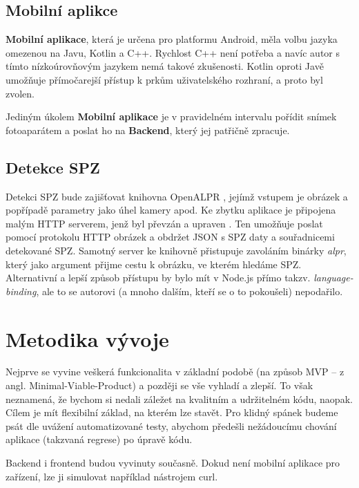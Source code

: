 \subsection{Mobilní aplikce} \label{mobile_app}

\textbf{Mobilní aplikace}, která je určena pro platformu Android, měla volbu jazyka omezenou na Javu, Kotlin a C++.
Rychlost C++ není potřeba a navíc autor s tímto nízkoúrovňovým jazykem nemá takové zkušenosti.
Kotlin oproti Javě umožňuje přímočarejší přístup k prkům uživatelského rozhraní, a proto byl zvolen.

Jediným úkolem \textbf{Mobilní aplikace} je v pravidelném intervalu pořídit snímek fotoaparátem a poslat ho na
\textbf{Backend}, který jej patřičně zpracuje.

\subsection{Detekce SPZ}

Detekci SPZ bude zajišťovat knihovna OpenALPR \citep[viz][]{OpenALPR}, jejímž vstupem je obrázek a popřípadě
parametry jako úhel kamery apod. Ke zbytku aplikace je připojena malým HTTP serverem, jenž byl převzán a upraven
\citep[viz][]{OpenALPR_Server}.
Ten umožňuje poslat pomocí protokolu HTTP obrázek a obdržet JSON s SPZ daty a souřadnicemi detekované SPZ.
Samotný server ke knihovně přistupuje zavoláním binárky \textit{alpr}, který jako argument přijme cestu k
obrázku, ve kterém hledáme SPZ. Alternativní a lepší způsob přístupu by bylo mít v Node.js přímo takzv.
\textit{language-binding}, ale to se autorovi (a mnoho dalším, kteří se o to pokoušeli) nepodařilo.

\section{Metodika vývoje}

Nejprve se vyvine veškerá funkcionalita v základní podobě
(na způsob MVP -- z angl. Minimal-Viable-Product) a později se vše vyhladí a zlepší. To však neznamená,
že bychom si nedali záležet na kvalitním a udržitelném kódu, naopak. Cílem je mít flexibilní základ,
na kterém lze stavět. Pro klidný spánek budeme psát dle uvážení automatizované testy, abychom předešli
nežádoucímu chování aplikace (takzvaná regrese) po úpravě kódu.

Backend i frontend budou vyvinuty současně. Dokud není mobilní aplikace pro zařízení, lze ji simulovat
například nástrojem curl.
